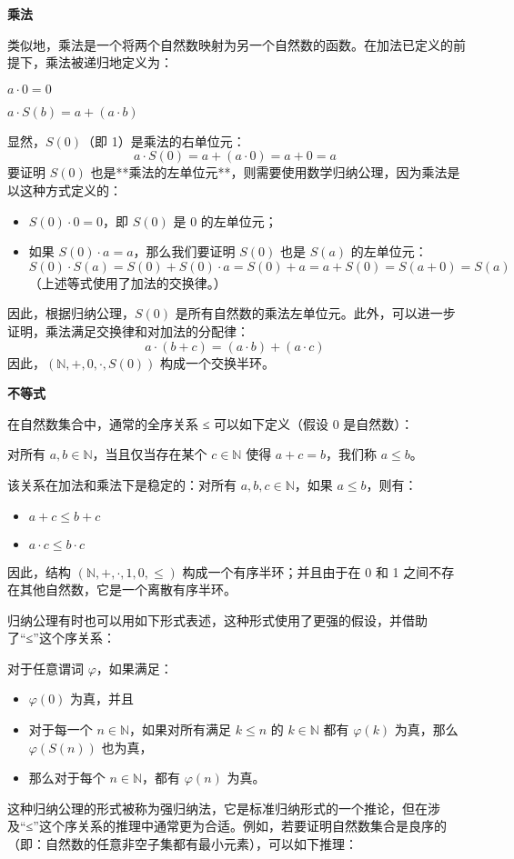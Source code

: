 \textbf{乘法}

类似地，乘法是一个将两个自然数映射为另一个自然数的函数。在加法已定义的前提下，乘法被递归地定义为：

$a \cdot 0 = 0$

$a \cdot S(b) = a + (a \cdot b)$

显然，$S(0)$（即 1）是乘法的右单位元：
$$
a \cdot S(0) = a + (a \cdot 0) = a + 0 = a~
$$
要证明 $S(0)$ 也是**乘法的左单位元**，则需要使用数学归纳公理，因为乘法是以这种方式定义的：
\begin{itemize}
\item $S(0) \cdot 0 = 0$，即 $S(0)$ 是 0 的左单位元；
\item 如果 $S(0) \cdot a = a$，那么我们要证明 $S(0)$ 也是 $S(a)$ 的左单位元：
$$
S(0) \cdot S(a) = S(0) + S(0) \cdot a = S(0) + a = a + S(0) = S(a + 0) = S(a)~
$$
（上述等式使用了加法的交换律。）
\end{itemize}
因此，根据归纳公理，$S(0)$ 是所有自然数的乘法左单位元。此外，可以进一步证明，乘法满足交换律和对加法的分配律：
$$
a \cdot (b + c) = (a \cdot b) + (a \cdot c)~
$$
因此，$(\mathbb{N}, +, 0, \cdot, S(0))$ 构成一个交换半环。

\textbf{不等式}

在自然数集合中，通常的全序关系 ≤ 可以如下定义（假设 0 是自然数）：

对所有 $a, b \in \mathbb{N}$，当且仅当存在某个 $c \in \mathbb{N}$ 使得 $a + c = b$，我们称 $a \leq b$。

该关系在加法和乘法下是稳定的：对所有 $a, b, c \in \mathbb{N}$，如果 $a \leq b$，则有：
\begin{itemize}
\item $a + c \leq b + c$
\item $a \cdot c \leq b \cdot c$
\end{itemize}
因此，结构 $(\mathbb{N}, +, \cdot, 1, 0, \leq)$ 构成一个有序半环；并且由于在 0 和 1 之间不存在其他自然数，它是一个离散有序半环。

归纳公理有时也可以用如下形式表述，这种形式使用了更强的假设，并借助了“≤”这个序关系：

对于任意谓词 $\varphi$，如果满足：
\begin{itemize}
\item $\varphi(0)$ 为真，并且
\item 对于每一个 $n \in \mathbb{N}$，如果对所有满足 $k \leq n$ 的 $k \in \mathbb{N}$ 都有 $\varphi(k)$ 为真，那么 $\varphi(S(n))$ 也为真，
\item 那么对于每个 $n \in \mathbb{N}$，都有 $\varphi(n)$ 为真。
\end{itemize}
这种归纳公理的形式被称为强归纳法，它是标准归纳形式的一个推论，但在涉及“≤”这个序关系的推理中通常更为合适。例如，若要证明自然数集合是良序的（即：自然数的任意非空子集都有最小元素），可以如下推理：

